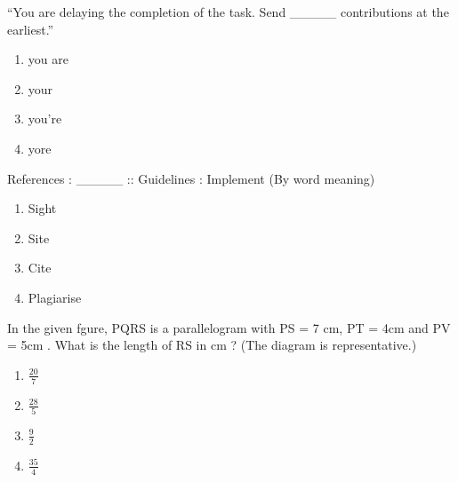  \iffalse
    \title{Assignment}
    \author{EE24BTECH11035}
    \section{ph}
    \chapter{2023}
  \fi
\item ``You are delaying the completion of the task. Send \_\_\_\_\_ contributions at the earliest.''
  \begin{enumerate}
    \item you are
    \item your
    \item you're
    \item yore
  \end{enumerate}

\item References : \_\_\_\_\_ :: Guidelines : Implement (By word meaning)
  \begin{enumerate}
    \item Sight
    \item Site
    \item Cite
    \item Plagiarise
  \end{enumerate}
 \item In the given fgure, PQRS is a parallelogram with PS = 7 cm, PT = 4cm and PV = 5cm . What is the length of RS in cm ? (The diagram is representative.)
 \begin{enumerate}
     \item $\frac{20}{7}$
     \item $\frac{28}{5}$
     \item $\frac{9}{2}$
     \item $\frac{35}{4}$
 \end{enumerate}
 

